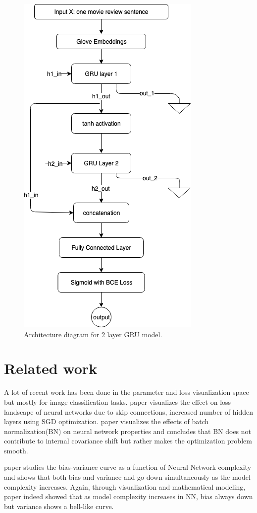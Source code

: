 \documentclass{article}
\begin{document}
\begin{figure}[h]
	\includegraphics[scale=0.5]{gru_model_architecture.png}
	\centering
	\caption{Architecture diagram for 2 layer GRU model.}
	\label{fig:gru_model}
\end{figure}

\section{Related work}
A lot of recent work has been done in the parameter and loss visualization space but mostly for image classification tasks. \cite{li2018visualizing} paper visualizes the effect on loss landscape of neural networks due to skip connections, increased number of hidden layers using SGD optimization. \cite{NIPS2018_7515} paper visualizes the effects of batch normalization(BN) on neural network properties and concludes that BN does not contribute to internal covariance shift but rather makes the optimization problem smooth.

\cite{neal2019modern} paper studies the bias-variance curve as a function of Neural Network complexity and shows that both bias and variance and go down simultaneously as the model complexity increases. Again, through visualization and mathematical modeling, \cite{yang2020rethinking} paper indeed showed that as model complexity increases in NN, bias always down but variance shows a bell-like curve.
\end{document}
